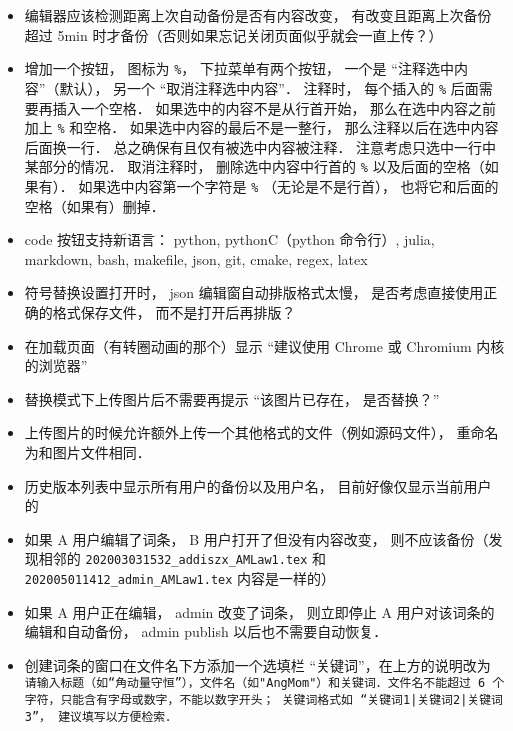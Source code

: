 \begin{itemize}
\item 编辑器应该检测距离上次自动备份是否有内容改变， 有改变且距离上次备份超过 5min 时才备份（否则如果忘记关闭页面似乎就会一直上传？）

\item 增加一个按钮， 图标为 \verb|%|， 下拉菜单有两个按钮， 一个是 “注释选中内容”（默认）， 另一个 “取消注释选中内容”． 注释时， 每个插入的 \verb|%| 后面需要再插入一个空格． 如果选中的内容不是从行首开始， 那么在选中内容之前加上 \verb|%| 和空格． 如果选中内容的最后不是一整行， 那么注释以后在选中内容后面换一行． 总之确保有且仅有被选中内容被注释． 注意考虑只选中一行中某部分的情况． 取消注释时， 删除选中内容中行首的 \verb|%| 以及后面的空格（如果有）． 如果选中内容第一个字符是 \verb|%| （无论是不是行首）， 也将它和后面的空格（如果有）删掉．

\item code 按钮支持新语言： python, pythonC（python 命令行）, julia, markdown, bash, makefile, json, git, cmake, regex, latex

\item 符号替换设置打开时， json 编辑窗自动排版格式太慢， 是否考虑直接使用正确的格式保存文件， 而不是打开后再排版？

\item 在加载页面（有转圈动画的那个）显示 “建议使用 Chrome 或 Chromium 内核的浏览器”

\item 替换模式下上传图片后不需要再提示 “该图片已存在， 是否替换？”

\item 上传图片的时候允许额外上传一个其他格式的文件（例如源码文件）， 重命名为和图片文件相同．

\item 历史版本列表中显示所有用户的备份以及用户名， 目前好像仅显示当前用户的

\item 如果 A 用户编辑了词条， B 用户打开了但没有内容改变， 则不应该备份（发现相邻的 \verb|202003031532_addiszx_AMLaw1.tex| 和 \verb|202005011412_admin_AMLaw1.tex| 内容是一样的）

\item 如果 A 用户正在编辑， admin 改变了词条， 则立即停止 A 用户对该词条的编辑和自动备份， admin publish 以后也不需要自动恢复．

\item 创建词条的窗口在文件名下方添加一个选填栏 “关键词”，在上方的说明改为 \lstinline+请输入标题（如“角动量守恒”），文件名（如"AngMom"）和关键词．文件名不能超过 6 个字符，只能含有字母或数字，不能以数字开头； 关键词格式如 “关键词1|关键词2|关键词3”， 建议填写以方便检索．+


\end{itemize}

